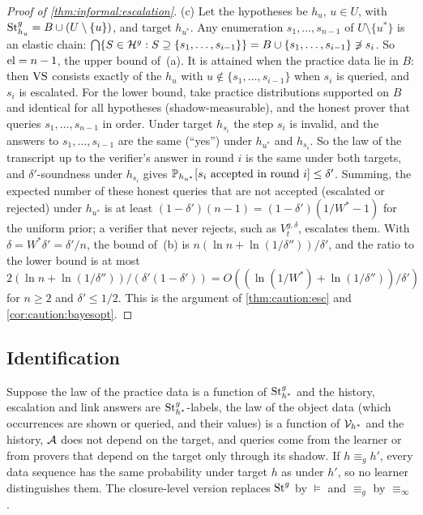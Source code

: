 \begin{proof}[Proof of \cref{thm:informal:escalation}]
(c) Let the hypotheses be $h_u$, $u\in U$, with $\mathrm{St}^{g}_{h_u}=B\cup(U\setminus\{u\})$, and target $h_{u^*}$. Any enumeration $s_1,\dots,s_{n-1}$ of $U\setminus\{u^*\}$ is an elastic chain: $\bigcap\{S\in\mathcal{H}^g:S\supseteq\{s_1,\dots,s_{i-1}\}\}=B\cup\{s_1,\dots,s_{i-1}\}\not\ni s_i$. So $\mathrm{el}=n-1$, the upper bound of~(a). It is attained when the practice data lie in $B$: then $\mathrm{VS}$ consists exactly of the $h_u$ with $u\notin\{s_1,\dots,s_{i-1}\}$ when $s_i$ is queried, and $s_i$ is escalated. For the lower bound, take practice distributions supported on $B$ and identical for all hypotheses (shadow-measurable), and the honest prover that queries $s_1,\dots,s_{n-1}$ in order. Under target $h_{s_i}$ the step $s_i$ is invalid, and the answers to $s_1,\dots,s_{i-1}$ are the same (``yes'') under $h_{u^*}$ and $h_{s_i}$. So the law of the transcript up to the verifier's answer in round $i$ is the same under both targets, and $\delta'$-soundness under $h_{s_i}$ gives $\mathbb{P}_{h_{u^*}}[s_i\text{ accepted in round }i]\le\delta'$. Summing, the expected number of these honest queries that are not accepted (escalated or rejected) under $h_{u^*}$ is at least $(1-\delta')(n-1)=(1-\delta')(1/W^*-1)$ for the uniform prior; a verifier that never rejects, such as $V^{g,\delta}_t$, escalates them. With $\delta=W^*\delta'=\delta'/n$, the bound of~(b) is $n(\ln n+\ln(1/\delta''))/\delta'$, and the ratio to the lower bound is at most $2(\ln n+\ln(1/\delta''))/(\delta'(1-\delta'))=O((\ln(1/W^*)+\ln(1/\delta''))/\delta')$ for $n\ge2$ and $\delta'\le1/2$. This is the argument of \cref{thm:caution:esc} and \cref{cor:caution:bayesopt}.
\end{proof}

\subsection{Identification}\label{app:informal:identify}

\begin{proposition}\label{prop:informal:shadow}
Suppose the law of the practice data is a function of $\mathrm{St}^{g}_{h^*}$ and the history, escalation and link answers are $\mathrm{St}^{g}_{h^*}$-labels, the law of the object data (which occurrences are shown or queried, and their values) is a function of $\mathcal V_{h^*}$ and the history, $\mathcal{A}$ does not depend on the target, and queries come from the learner or from provers that depend on the target only through its shadow. If $h\equiv_gh'$, every data sequence has the same probability under target $h$ as under $h'$, so no learner distinguishes them. The closure-level version replaces $\mathrm{St}^{g}_{}$ by ${\models}$ and $\equiv_g$ by $\equiv_\infty$.
\end{proposition}

